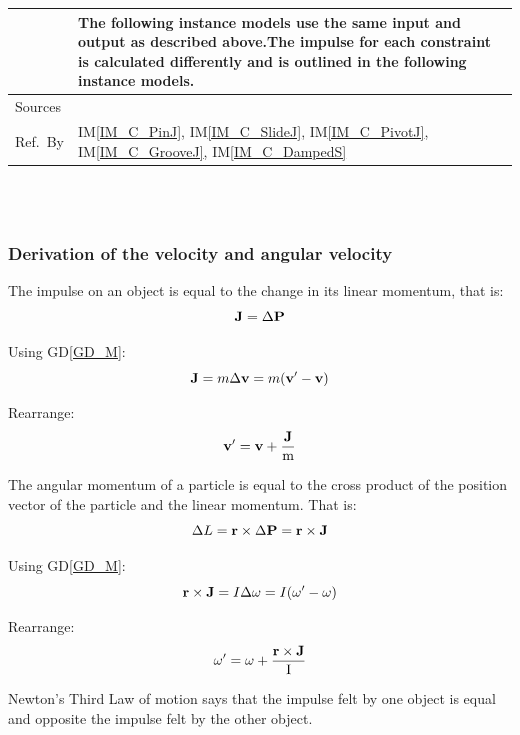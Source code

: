 \documentclass[12pt]{article}
\newcommand{\colAwidth}{0.13\textwidth}
\newcommand{\colBwidth}{0.82\textwidth}
\begin{document}
\begin{minipage}{\textwidth}
\begin{tabular}{| p{\colAwidth} | p{\colBwidth}|}
&The following instance models use the same input and output as described above.The impulse for each constraint is calculated differently and is outlined in
the following instance models. \\
  \hline  
  Sources &\\
  \hline
Ref.\ By & IM\ref{IM_C_PinJ}, IM\ref{IM_C_SlideJ}, IM\ref{IM_C_PivotJ},
IM\ref{IM_C_GrooveJ}, IM\ref{IM_C_DampedS} \\
  \hline
\end{tabular}
\end{minipage}\\
~\newline

\subsubsection {Derivation of the velocity and angular velocity}

The impulse on an object is equal to the change in its linear momentum, that is:\begin{equation*}
\textbf J = \Delta \textbf P 
\end{equation*}

\noindent 
Using GD\ref{GD_M}:
\begin{equation*}
\textbf J  = m\Delta \textbf v = m(\textbf v' - \textbf v)
\end{equation*}

\noindent
Rearrange:
\begin{equation*}
\bf v' =  v + \frac{J}{ \textnormal m}
\end{equation*}

\noindent
The angular momentum of a particle is equal to the cross product of the position 
vector of the particle and the linear momentum. That is:
\begin{equation*}
\Delta L = \textbf r \times \Delta \textbf P = \textbf r  \times \textbf J 
\end{equation*}

\noindent 
Using GD\ref{GD_M}:
\begin{equation*}
 \textbf r  \times  \textbf J  = I \Delta \omega = I(\omega'-\omega)
\end{equation*}

\noindent
Rearrange: 
\begin{equation*}
\omega'=   \omega + \frac{\textbf r \times \textbf J}{\textnormal I}
\end{equation*}

\noindent
Newton's Third Law of motion says that the impulse felt by one object is
equal and opposite the impulse felt by the other object.
\end{document}
